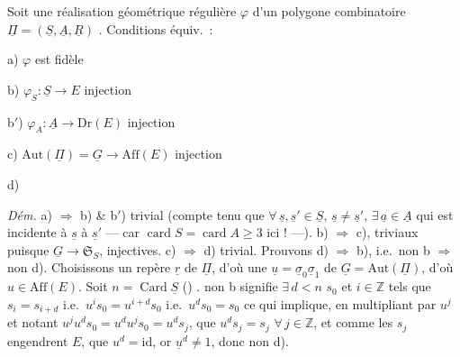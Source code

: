 \documentclass[11pt,a4paper]{article}
\begin{document}

  Soit une réalisation géométrique  régulière $\varphi$ d'un polygone combinatoire $\underline{\Pi} = (\underline{S}, \underline{A}, \underline{R})$  . Conditions équiv.\ :

a) $\varphi$ est fidèle

b) $\varphi_S : \underline{S} \to E$ injection

b$'$) $\varphi_A : \underline{A} \to \mathrm{Dr}(E)$ injection

c) $\mathrm{Aut}(\underline{\Pi}) = \underline{G} \to \mathrm{Aff}(E)$ injection

d)  

\emph{Dém.} a) $\Rightarrow$ b) \& b$'$) trivial (compte tenu que $\forall\, \underline{s}, \underline{s}' \in \underline{S}$, $\underline{s} \neq \underline{s}'$, $\exists\, \underline{a} \in \underline{A}$ qui est incidente à $\underline{s}$   à $\underline{s}'$ — car $\operatorname{card} S = \operatorname{card} A \geq 3$ ici ! —).
b) $\Rightarrow$ c),  triviaux puisque $\underline{G} \to \mathfrak{S}_S$,  injectives.
 c) $\Rightarrow$ d) trivial. Prouvons d) $\Rightarrow$ b), i.e.\ non b $\Rightarrow$ non d). Choisissons un  repère $\underline{r}$ de $\underline{\Pi}$, d'où une  \struck{\ill{}} $\underline{u} = \underline{\sigma}_0 \underline{\sigma}_1$ de $\underline{G} = \mathrm{Aut}(\underline{\Pi})$, d'où $u \in \mathrm{Aff}(E)$. Soit $n = \operatorname{Card} \underline{S}$ () .   non b signifie $\exists\, d < n$  $s_0$ et $i \in \mathbb{Z}$ tels que $s_i = s_{i+d}$ i.e.\ $u^i s_0 = u^{i+d} s_0$ i.e.\ $u^d s_0 = s_0$ ce qui implique, en multipliant par $u^j$ et notant $u^j u^d s_0 = u^d u^j s_0 = u^d s_j$, que $u^d s_j = s_j$ $\forall\, j \in \mathbb{Z}$, et comme les $s_j$ engendrent $E$,  que $u^d = \mathrm{id}$,  or $\underline{u}^d \neq 1$, donc non d). 
\end{document}
